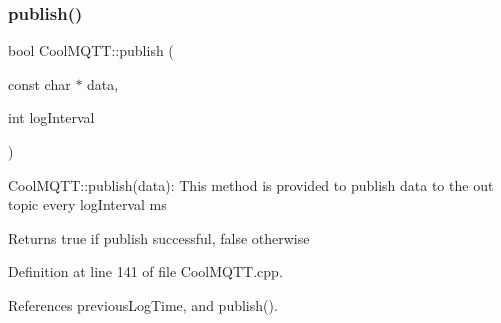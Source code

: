 \subsubsection{\texorpdfstring{publish()}{publish()}\hspace{0.1cm}{\footnotesize\ttfamily [2/2]}}
{\footnotesize\ttfamily bool Cool\+M\+Q\+T\+T\+::publish (\begin{DoxyParamCaption}\item[{const char $\ast$}]{data,  }\item[{int}]{log\+Interval }\end{DoxyParamCaption})}

Cool\+M\+Q\+T\+T\+::publish(data)\+: This method is provided to publish data to the out topic every log\+Interval ms

\begin{DoxyReturn}{Returns}
true if publish successful, false otherwise 
\end{DoxyReturn}


Definition at line 141 of file Cool\+M\+Q\+T\+T.\+cpp.



References previous\+Log\+Time, and publish().


